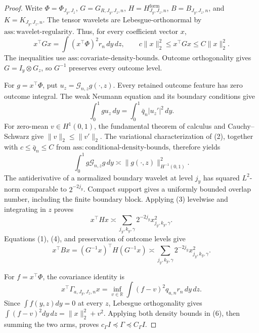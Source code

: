 \documentclass{article}
\begin{document}
\begin{proof}
Write \(\Phi=\Phi_{J_y,J_z}\), \(G=G_{R,J_y,J_z,n}\), \(H=H^{\mathrm{form}}_{J_y,J_z,n}\), \(B=B_{J_y,J_z,n}\), and \(K=K_{J_y,J_z,n}\). The tensor wavelets are Lebesgue-orthonormal by \(\mathrm{ass{:}wavelet\text{-}regularity}\). Thus, for every coefficient vector \(x\),
\[
x^\top Gx=\int(x^\top\Phi)^2r_n\,dy\,dz,
\qquad c\|x\|_2^2\le x^\top Gx\le C\|x\|_2^2.                 \tag{1}
\]
The inequalities use \(\mathrm{ass{:}covariate\text{-}density\text{-}bounds}\). Outcome orthogonality gives \(G=I_y\otimes G_z\), so \(G^{-1}\) preserves every outcome level.

For \(g=x^\top\Phi\), put \(u_z=\mathcal G_{n,z}g(\cdot,z)\). Every retained outcome feature has zero outcome integral. The weak Neumann equation and its boundary conditions give
\[
\int_0^1g u_z\,dy=\int_0^1\bar q_n|u_z'|^2\,dy.                 \tag{2}
\]
For zero-mean \(v\in H^1(0,1)\), the fundamental theorem of calculus and Cauchy--Schwarz give \(\|v\|_2\le\|v'\|_2\). The variational characterization of (2), together with \(c\le\bar q_n\le C\) from \(\mathrm{ass{:}conditional\text{-}density\text{-}bounds}\), therefore yields
\[
\int_0^1g\mathcal G_{n,z}g\,dy\asymp\|g(\cdot,z)\|_{H^{-1}(0,1)}^2. \tag{3}
\]
The antiderivative of a normalized boundary wavelet at level \(j_y\) has squared \(L^2\)-norm comparable to \(2^{-2j_y}\). Compact support gives a uniformly bounded overlap number, including the finite boundary block. Applying (3) levelwise and integrating in \(z\) proves
\[
x^\top Hx\asymp\sum_{j_y,k_y,\gamma}2^{-2j_y}x_{j_y,k_y,\gamma}^2. \tag{4}
\]
Equations (1), (4), and preservation of outcome levels give
\[
x^\top Bx=(G^{-1}x)^\top H(G^{-1}x)
\asymp\sum_{j_y,k_y,\gamma}2^{-2j_y}x_{j_y,k_y,\gamma}^2.       \tag{5}
\]

For \(f=x^\top\Phi\), the covariance identity is
\[
x^\top\Gamma_{a,J_y,J_z,n}x
=\inf_{v\in\mathbb R}\int(f-v)^2q_{a,n}r_n\,dy\,dz.             \tag{6}
\]
Since \(\int f(y,z)dy=0\) at every \(z\), Lebesgue orthogonality gives \(\int(f-v)^2dy\,dz=\|x\|_2^2+v^2\). Applying both density bounds in (6), then summing the two arms, proves \(c_\Gamma I\preceq\Gamma\preceq C_\Gamma I\).


\end{proof}
\end{document}
